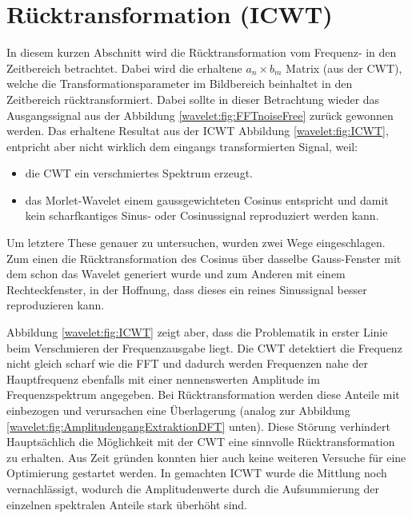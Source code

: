 %
%
%
%
\section{Rücktransformation (ICWT)
	\label{wavelets:section:teil5}}

In diesem kurzen Abschnitt wird die Rücktransformation vom Frequenz-
in den Zeitbereich betrachtet.
Dabei wird die erhaltene $a_n \times b_m$ Matrix (aus der CWT),
welche die Transformationsparameter im Bildbereich beinhaltet in
den Zeitbereich rücktransformiert.
Dabei sollte in dieser Betrachtung wieder das Ausgangssignal aus
der Abbildung \ref{wavelet:fig:FFTnoiseFree} zurück gewonnen werden.
Das erhaltene Resultat aus der ICWT Abbildung \ref{wavelet:fig:ICWT},
entpricht aber nicht wirklich dem eingangs transformierten Signal,
weil:

\begin{itemize}
	\item die CWT ein verschmiertes Spektrum erzeugt.
	\item das Morlet-Wavelet einem gaussgewichteten Cosinus
	entspricht und damit kein scharfkantiges Sinus- oder
	Cosinussignal reproduziert werden kann.
\end{itemize}

Um letztere These genauer zu untersuchen, wurden zwei Wege eingeschlagen.
Zum einen die Rücktransformation des Cosinus über dasselbe Gauss-Fenster
mit dem schon das Wavelet generiert wurde und zum Anderen mit einem
Rechteckfenster, in der Hoffnung, dass dieses ein reines Sinussignal
besser reproduzieren kann.

Abbildung \ref{wavelet:fig:ICWT} zeigt aber, dass die Problematik
in erster Linie beim Verschmieren der Frequenzausgabe liegt.
Die CWT detektiert die Frequenz nicht gleich scharf wie die FFT und
dadurch werden Frequenzen nahe der Hauptfrequenz ebenfalls mit einer
nennenswerten Amplitude im Frequenzspektrum angegeben.
Bei Rücktransformation werden diese Anteile mit einbezogen und
verursachen eine Überlagerung (analog zur Abbildung
\ref{wavelet:fig:AmplitudengangExtraktionDFT} unten).
Diese Störung verhindert Hauptsächlich die Möglichkeit mit der CWT eine sinnvolle Rücktransformation zu erhalten.
Aus Zeit gründen konnten hier auch keine weiteren Versuche für eine
Optimierung gestartet werden.
In gemachten ICWT wurde die Mittlung noch vernachlässigt, wodurch
die Amplitudenwerte durch die Aufsummierung der einzelnen spektralen
Anteile stark überhöht sind.

